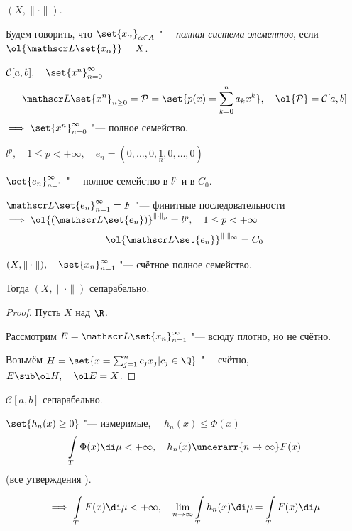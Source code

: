 \begin{definition}
	$ (X, \|\cdot\|) $.

	Будем говорить, что $ \set{x_\alpha}_{\alpha \in A} $ "--- \emph{полная система элементов},
	если $ \ol{\mathscr L\set{x_\alpha}} = X $.
\end{definition}

\begin{exmpls}
\item $ \mathcal C[a, b], \quad \set{x^n}_{n = 0}^\infty $
	$$ \mathscr L\set{x^n}_{n \ge 0} = \mathcal P = \set{p(x) = \sum_{k = 0}^n a_kx^k}, \quad
	\ol{\mathcal P} = \mathcal C[a, b] $$
	$ \implies \set{x^n}_{n = 0}^\infty $ "--- полное семейство.
\item $ l^p, \quad 1 \le p < +\infty, \quad e_n = (0, \dots, 0, \underset n 1, 0, \dots, 0) $

	$ \set{e_n}_{n = 1}^\infty $ "--- полное семейство в $ l^p $ и в $ C_0 $.

	$ \mathscr L\set{e_n}_{n = 1}^\infty = F $ "--- финитные последовательности $ \implies \ol{(\mathscr L{\set{e_n}})}^{\|\cdot\|_p} = l^p, \quad 1 \le p < +\infty $
	$$ \ol{\mathscr L\set{e_n}}^{\|\cdot\|_\infty} = C_0 $$
\end{exmpls}

\begin{statement}
	$ (X, \|\cdot\|), \quad \set{x_n}_{n = 1}^\infty $ "--- счётное полное семейство.

	Тогда $ (X, \|\cdot\|) $ сепарабельно.
\end{statement}

\begin{proof}
	Пусть $ X $ над $ \R $.

	Рассмотрим $ E = \mathscr L\set{x_n}_{n = 1}^\infty $ "--- всюду плотно, но не счётно.

	Возьмём $ H = \set{x = \sum_{j = 1}^n c_jx_j | c_j \in \Q} $  "--- счётно,
	$ E \sub \ol H, \quad \ol E = X $.
\end{proof}

\begin{implication}
	$ \mathcal C[a, b] $ сепарабельно.
\end{implication}

\begin{theorem}
	$ \set{h_n(x) \ge 0} $ "--- измеримые, $ \quad h_n(x) \le \Phi(x) $
	$$ \int\limits_T \Phi(x) \di \mu < +\infty, \quad
	h_n(x) \underarr{n \to \infty} F(x) $$
	(все утверждения \ale).

	$$ \implies \int\limits_T F(x) \di \mu < +\infty, \quad \lim\limits_{n \to \infty} \int\limits_T h_n(x) \di \mu = \int\limits_T F(x) \di \mu $$
\end{theorem}

